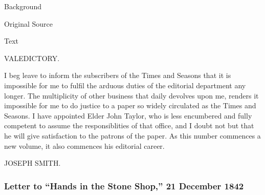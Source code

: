 			\begin{description}
				\item[Background]
			\end{description}
			
			
			\begin{description}
				\item[Original Source]
			\end{description}
			
			
			\begin{description}
				\item[Text]
			\end{description}
			
				\begin{tightcenter}
					VALEDICTORY.
				\end{tightcenter}
				
				I beg leave to inform the subscribers of the Times and Seasons that it is impossible for me to fulfil the arduous duties of the editorial department any longer. The multiplicity of other business that daily devolves upon me, renders it impossible for me to do justice to a paper so widely circulated as the Times and Seasons. I have appointed Elder John Taylor, who is less encumbered and fully competent to assume the responsiblities of that office, and I doubt not but that he will give satisfaction to the patrons of the paper. As this number commences a new volume, it also commences his editorial career.
				
				\begin{tightright}
					JOSEPH SMITH.
				\end{tightright}
		
		\subsubsection{Letter to ``Hands in the Stone Shop,'' 21 December 1842}
			\label{EMS-1842-JS-21-DEC-1842}
		
